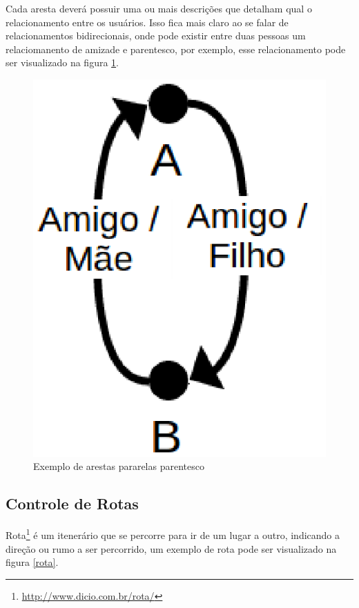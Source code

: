 Cada aresta deverá possuir uma ou mais descrições que detalham qual o relacionamento entre os usuários. Isso fica mais claro ao se falar de relacionamentos bidirecionais, onde pode existir entre duas pessoas um relaciomanento de amizade e parentesco, por exemplo, esse relacionamento pode ser visualizado na figura \ref{parentes}.

\begin{figure}[!h]
	\centering
	\includegraphics[scale=0.45]{figuras/capitulo5/parentes.eps}
	\caption{Exemplo de arestas pararelas parentesco}
	\label{parentes}
\end{figure}



\subsection{Controle de Rotas}

Rota\footnote{\url{http://www.dicio.com.br/rota/}} é um itenerário que se percorre para ir de um lugar a outro, indicando a direção ou rumo a ser percorrido, um exemplo de rota pode ser visualizado na figura \ref{rota}.

